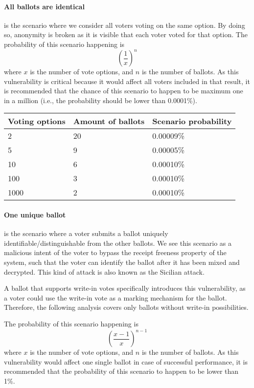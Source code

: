\paragraph{All ballots are identical} is the scenario where we consider all voters voting on the same option. By doing so, anonymity is broken as it is visible that each voter voted for that option. The probability of this scenario happening is
\[ \left( \frac{1}{x} \right)^n \]
where $x$ is the number of vote options, and $n$ is the number of ballots. As this vulnerability is critical because it would affect all voters included in that result, it is recommended that the chance of this scenario to happen to be maximum one in a million (i.e., the probability should be lower than 0.0001\%).

\begin{center}
    \begin{tabular}{|l|l|l|} \hline
        Voting options & Amount of ballots & Scenario probability \\ \hline

        2 & 20 & 0.00009\% \\ \hline
        5 & 9 & 0.00005\% \\ \hline
        10 & 6 & 0.00010\% \\ \hline
        100 & 3 & 0.00010\% \\ \hline
        1000 & 2 & 0.00010\% \\ \hline
    \end{tabular}    
\end{center} 

\paragraph{One unique ballot} is the scenario where a voter submits a ballot uniquely identifiable/distinguishable from the other ballots. We see this scenario as a malicious intent of the voter to bypass the receipt freeness property of the system, such that the voter can identify the ballot after it has been mixed and decrypted. This kind of attack is also known as the Sicilian attack.

A ballot that supports write-in votes specifically introduces this vulnerability, as a voter could use the write-in vote as a marking mechanism for the ballot. Therefore, the following analysis covers only ballots without write-in possibilities.

The probability of this scenario happening is
\[ \left( \frac{x-1}{x} \right) ^{n-1} \]
where $x$ is the number of vote options, and $n$ is the number of ballots. As this vulnerability would affect one single ballot in case of successful performance, it is recommended that the probability of this scenario to happen to be lower than 1\%.

